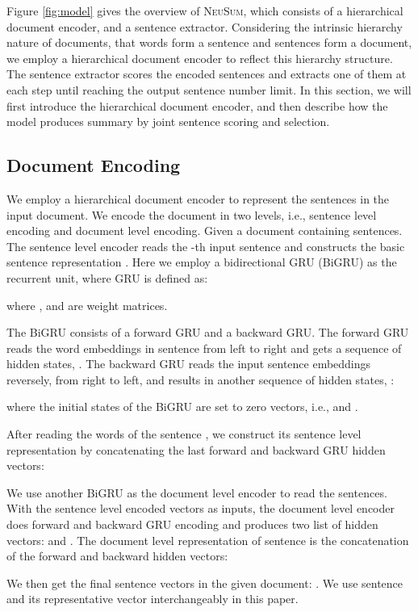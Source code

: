 \documentclass[11pt,a4paper]{article}
\newcommand{\ourModelName}{\textsc{NeuSum}}
\begin{document}
Figure \ref{fig:model} gives the overview of \ourModelName{}, which consists of a hierarchical document encoder, and a sentence extractor.
Considering the intrinsic hierarchy nature of documents, that words form a sentence and sentences form a document, we employ a hierarchical document encoder to reflect this hierarchy structure.
The sentence extractor scores the encoded sentences and extracts one of them at each step until reaching the output sentence number limit.
In this section, we will first introduce the hierarchical document encoder, and then describe how the model produces summary by joint sentence scoring and selection.



\subsection{Document Encoding}
We employ a hierarchical document encoder to represent the sentences in the input document.
We encode the document in two levels, i.e., sentence level encoding and document level encoding.
Given a  document  containing  sentences.
The sentence level encoder reads the -th input sentence  and constructs the basic sentence representation .
Here we employ a bidirectional GRU (BiGRU) \cite{cho-EtAl:2014:EMNLP2014} as the recurrent unit, where GRU is defined as:

where ,  and  are weight matrices.

The BiGRU consists of a forward GRU and a backward GRU.
The forward GRU reads the word embeddings in  sentence  from left to right and gets a sequence of hidden states, .
The backward GRU reads the input sentence embeddings reversely, from right to left, and results in another sequence of hidden states, :

where the initial states of the BiGRU are set to zero vectors, i.e.,  and .

After reading the words of the sentence , we construct its sentence level  representation  by concatenating the last forward and backward GRU hidden vectors:


We use another BiGRU as the document level encoder to read the sentences.
With the sentence level encoded vectors  as inputs, the document level encoder does forward and backward GRU encoding and produces two list of hidden vectors:  and .
The document level representation  of sentence  is the concatenation of the forward and backward hidden vectors:

We then get the final sentence vectors in the given document: .
We use sentence  and its representative vector  interchangeably in this paper.
\end{document}
